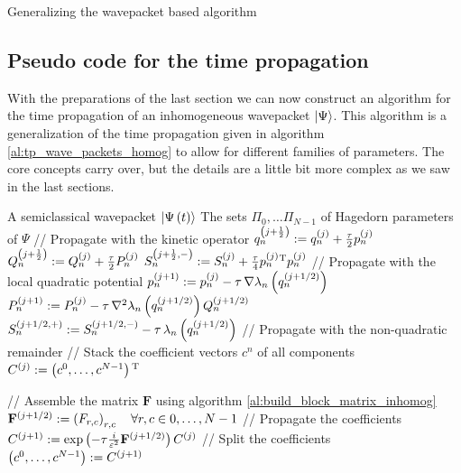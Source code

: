 \begin{chapter}{Generalizing the wavepacket based algorithm}
\subsection{Pseudo code for the time propagation}

With the preparations of the last section we can now construct an algorithm for the
time propagation of an inhomogeneous wavepacket $\Ket{\Psi}$. This algorithm is
a generalization of the time propagation given in algorithm \ref{al:tp_wave_packets_homog}
to allow for different families of parameters. The core concepts carry over, but
the details are a little bit more complex as we saw in the last sections.

\begin{algorithm}
\caption{Time propagation of a inhomogeneous wavepacket $\Ket{\Psi}$}
\label{al:tp_wave_packets_inhomog}
\begin{algorithmic}
  \REQUIRE A semiclassical wavepacket $\Ket{\Psi\left( t \right)}$
  \REQUIRE The sets $\Pi_0, \ldots \Pi_{N-1}$ of Hagedorn parameters of $\Psi$
  \STATE // Propagate with the kinetic operator
    \STATE $q_n^{\left(j+\frac{1}{2}\right)} := q_n^{\left(j\right)} + \frac{\tau}{2} p_n^{\left(j\right)}$
    \STATE $Q_n^{\left(j+\frac{1}{2}\right)} := Q_n^{\left(j\right)} + \frac{\tau}{2} P_n^{\left(j\right)}$
    \STATE $S_n^{\left(j+\frac{1}{2},-\right)} := S_n^{\left(j\right)} + \frac{\tau}{4} p_n^{\left(j\right)}{}^{\textnormal{T}} p_n^{\left(j\right)}$
  \ENDFOR
  \STATE // Propagate with the local quadratic potential
    \STATE $p_n^{\left(j+1\right)} := p_n^{\left(j\right)} - \tau \, \nabla \lambda_n\left( q_n^{\left(j+1/2\right)} \right)$
    \STATE $P_n^{\left(j+1\right)} := P_n^{\left(j\right)} - \tau \, \nabla^2 \lambda_n\left( q_n^{\left(j+1/2\right)} \right) Q_n^{\left(j+1/2\right)}$
    \STATE $S_n^{\left(j+1/2,+\right)} := S_n^{\left(j+1/2,-\right)} - \tau \, \lambda_n\left( q_n^{\left(j+1/2\right)} \right)$
  \ENDFOR
  \STATE // Propagate with the non-quadratic remainder
  \STATE // Stack the coefficient vectors $c^n$ of all components
  \STATE $C^{\left(j\right)} := \left(c^0, \hdots, c^{N-1}\right){}^{\textnormal{T}}$

  \STATE // Assemble the matrix $\mathbf{F}$ using algorithm \ref{al:build_block_matrix_inhomog}
  \STATE $\mathbf{F}^{\left(j+1/2\right)} := \left(F_{r,c}\right)_{r,c} \quad \forall r,c \in 0,\ldots,N-1$
  \STATE // Propagate the coefficients
  \STATE $C^{\left(j+1\right)} := \exp\left( -\tau \frac{i}{\varepsilon^2} \mathbf{F}^{\left(j+1/2\right)} \right) C^{\left(j\right)}$
  \STATE // Split the coefficients
  \STATE $\left(c^0, \ldots, c^{N-1}\right) := C^{\left(j+1\right)}$


\end{algorithmic}
\end{algorithm}
\end{chapter}
